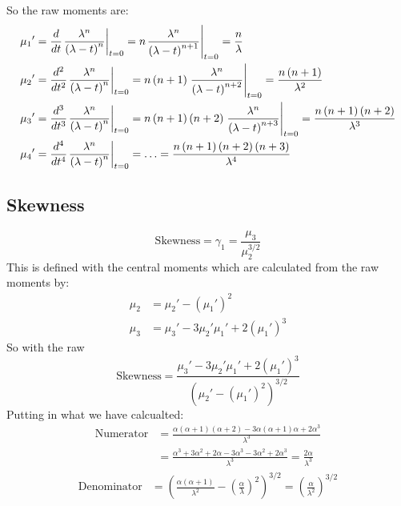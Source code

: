 \documentclass{article}
\begin{document}
So the raw moments are:
\[\begin{gathered}
        {\mu _1}' = \frac{d}{{dt}}{\left. {\frac{{{\lambda ^n}}}{{{{\left( {\lambda  - t} \right)}^n}}}} \right|_{t = 0}} = n{\left. {\frac{{{\lambda ^n}}}{{{{\left( {\lambda  - t} \right)}^{n + 1}}}}} \right|_{t = 0}} = \frac{n}{\lambda } \hfill \\
        {\mu _2}' = \frac{{{d^2}}}{{d{t^2}}}{\left. {\frac{{{\lambda ^n}}}{{{{\left( {\lambda  - t} \right)}^n}}}} \right|_{t = 0}} = n\left( {n + 1} \right){\left. {\frac{{{\lambda ^n}}}{{{{\left( {\lambda  - t} \right)}^{n + 2}}}}} \right|_{t = 0}} = \frac{{n\left( {n + 1} \right)}}{{{\lambda ^2}}} \hfill \\
        {\mu _3}' = \frac{{{d^3}}}{{d{t^3}}}{\left. {\frac{{{\lambda ^n}}}{{{{\left( {\lambda  - t} \right)}^n}}}} \right|_{t = 0}} = n\left( {n + 1} \right)\left( {n + 2} \right){\left. {\frac{{{\lambda ^n}}}{{{{\left( {\lambda  - t} \right)}^{n + 3}}}}} \right|_{t = 0}} = \frac{{n\left( {n + 1} \right)\left( {n + 2} \right)}}{{{\lambda ^3}}} \hfill \\
        {\mu _4}' = \frac{{{d^4}}}{{d{t^4}}}{\left. {\frac{{{\lambda ^n}}}{{{{\left( {\lambda  - t} \right)}^n}}}} \right|_{t = 0}} =\ldots = \frac{{n\left( {n + 1} \right)\left( {n + 2} \right)\left( {n + 3} \right)}}{{{\lambda ^4}}} \hfill \\
    \end{gathered} \]

\subsection{Skewness}
\[
    \text{Skewness} = \gamma_1 = \frac{\mu_3}{\mu_2^{3/2}}
\]
This is defined with the central moments which are calculated from the raw moments by:
\[
    \begin{aligned}
        \mu_2 & = \mu_2' - (\mu_1')^2                  \\
        \mu_3 & = \mu_3' - 3\mu_2'\mu_1' + 2(\mu_1')^3
    \end{aligned}
\]
So with the raw
\[
    \text{Skewness} = \frac{\mu_3' - 3\mu_2'\mu_1' + 2(\mu_1')^3}{\left( \mu_2' - (\mu_1')^2 \right)^{3/2}}
\]
Putting in what we have calcualted:
\[
    \begin{aligned}
        \text{Numerator} & = \frac{
            \alpha(\alpha + 1)(\alpha + 2)
            - 3\alpha(\alpha + 1)\alpha
            + 2\alpha^3
        }{\lambda^3}                \\
                         & = \frac{
            \alpha^3 + 3\alpha^2 + 2\alpha
            - 3\alpha^3 - 3\alpha^2
            + 2\alpha^3
        }{\lambda^3}
        = \frac{2\alpha}{\lambda^3}
    \end{aligned}
\]
\[
    \begin{aligned}
        \text{Denominator} & =
        \left( \frac{\alpha(\alpha + 1)}{\lambda^2} - \left( \frac{\alpha}{\lambda} \right)^2 \right)^{3/2}
        = \left( \frac{\alpha}{\lambda^2} \right)^{3/2}
    \end{aligned}
\]
\end{document}
